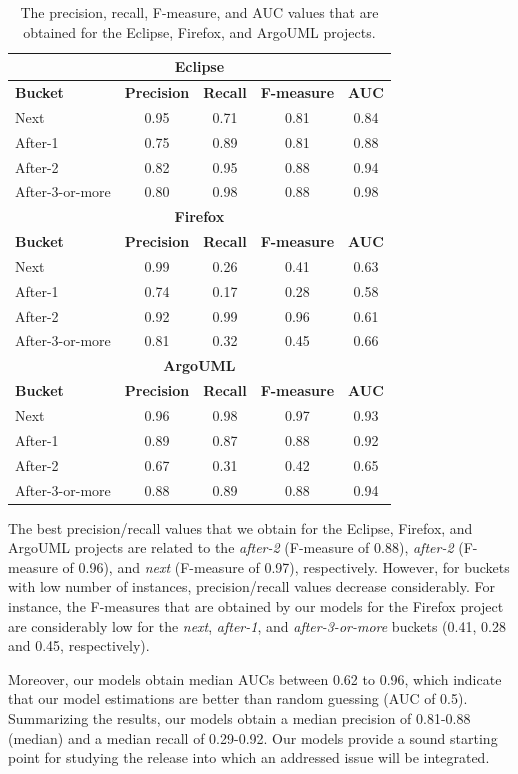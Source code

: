\begin{table}
	\footnotesize
	\centering
	\caption{The precision, recall, F-measure, and AUC values that are
	obtained for the Eclipse, Firefox, and ArgoUML projects. 
	\label{ch4:tbl:evaluation_metrics}
	}
	\begin{tabular}{lcccc}
		\hline
		\multicolumn{5}{c}{\textbf{Eclipse}}\tabularnewline
		\hline 
		\textbf{Bucket} & \textbf{Precision} & \textbf{Recall} &
		\textbf{F-measure} & \textbf{AUC}\tabularnewline
		\hline 
		Next & 0.95  & 0.71  & 0.81 & 0.84 \tabularnewline
		\hline 
		After-1 & 0.75 & 0.89 & 0.81 & 0.88\tabularnewline
		\hline 
		After-2 & 0.82 & 0.95 & 0.88 & 0.94\tabularnewline
		\hline 
		After-3-or-more & 0.80 & 0.98 & 0.88 & 0.98\tabularnewline
		\hline 
		\hline
		\multicolumn{5}{c}{\textbf{Firefox}}\tabularnewline
		\hline 
		\textbf{Bucket} & \textbf{Precision} & \textbf{Recall} &
		\textbf{F-measure} & \textbf{AUC}\tabularnewline
		\hline 
		Next & 0.99  & 0.26  & 0.41 & 0.63 \tabularnewline
		\hline 
		After-1 & 0.74 & 0.17 & 0.28 & 0.58\tabularnewline
		\hline 
		After-2 & 0.92 & 0.99 & 0.96 & 0.61\tabularnewline
		\hline 
		After-3-or-more & 0.81 & 0.32 & 0.45 & 0.66\tabularnewline
		\hline 
		\hline
		\multicolumn{5}{c}{\textbf{ArgoUML}}\tabularnewline
		\hline 
		\textbf{Bucket} & \textbf{Precision} & \textbf{Recall} &
		\textbf{F-measure} & \textbf{AUC}\tabularnewline
		\hline 
		Next & 0.96  & 0.98  & 0.97 & 0.93 \tabularnewline
		\hline 
		After-1 & 0.89 & 0.87 & 0.88 & 0.92\tabularnewline
		\hline 
		After-2 & 0.67 & 0.31 & 0.42 & 0.65\tabularnewline
		\hline 
		After-3-or-more & 0.88 & 0.89 & 0.88 & 0.94\tabularnewline
		\hline 
	\end{tabular}
\end{table}

The best precision/recall values that we obtain for the Eclipse, Firefox, and
ArgoUML projects are related to the \textit{after-2} (F-measure of 0.88),
\textit{after-2} (F-measure of 0.96), and \textit{next} (F-measure of 0.97),
respectively. However, for buckets with low number of instances,
precision/recall values decrease considerably. For instance, the F-measures that
are obtained by our models for the Firefox project are considerably low for the
\textit{next}, \textit{after-1}, and \textit{after-3-or-more} buckets (0.41,
0.28 and 0.45, respectively).

Moreover, our models obtain median AUCs between 0.62 to 0.96, which indicate
that our model estimations are better than random guessing (AUC of 0.5).
Summarizing the results, our models obtain a median precision of 0.81-0.88
(median) and a median recall of 0.29-0.92. Our models provide a sound starting
point for studying the release into which an addressed issue will be integrated.\\

